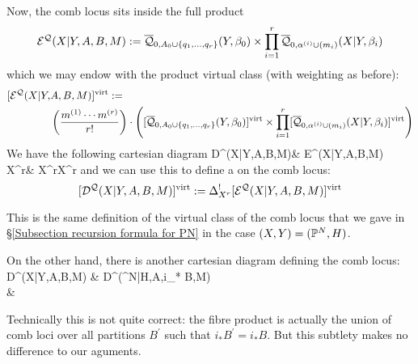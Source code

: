 Now, the comb locus sits inside the full product
\begin{equation*} \mathcal E^{\mathcal{Q}}(X|Y,A,B,M) := \overline{\mathcal Q}_{0,A_0 \cup \{q_1, \ldots, q_r\}}(Y,\beta_0) \times \prod_{i=1}^r \overline{\mathcal Q}_{0,\alpha^{(i)}\cup (m_i)}(X|Y,\beta_i) \end{equation*}
which we may endow with the product virtual class (with weighting as before):
\begin{align*} [\mathcal E^{\mathcal{Q}}(X|Y, & A,B,M)]^{\operatorname{virt}} := \\
& \left( \dfrac{m^{(1)} \cdots m^{(r)}}{r!}\right) \cdot \left( [\overline{\mathcal Q}_{0,A_0 \cup \{q_1, \ldots, q_r\}}(Y,\beta_0)]^{\operatorname{virt}} \times \prod_{i=1}^r [\overline{\mathcal Q}_{0,\alpha^{(i)}\cup (m_i)}(X|Y,\beta_i)]^{\operatorname{virt}} \right) \end{align*}
We have the following cartesian diagram
\bcd
\mathcal D^{}(X|Y,A,B,M)\ar[r]\ar[d] & \mathcal E^{}(X|Y,A,B,M)\ar[d] \\
X^r\ar[r,"\Delta_{X^r}"] & X^r\times X^r
\ecd
and we can use this to define a  on the comb locus:
\[
 [\mathcal D^{\mathcal{Q}}(X|Y,A,B,M)]^{\operatorname{virt}} := \Delta_{X^r}^![\mathcal E^{\mathcal{Q}}(X|Y,A,B,M)]^{\operatorname{virt}}
\]
\begin{remark} This is the same definition of the virtual class of the comb locus that we gave in \S \ref{Subsection recursion formula for PN} in the case $(X,Y)=(\mathbb P^N,H)$. \end{remark}

On the other hand, there is another cartesian diagram defining the comb locus:
\bcd
\mathcal D^(X|Y,A,B,M) \ar[r,"k"] \ar[d]  & \mathcal D^(\PP^N|H,A,i_* B,M) \ar[d] \\
 \ar[r,"k"] & 
\ecd
\begin{remark} Technically this is not quite correct: the fibre product is actually the union of comb loci over all partitions $B^\prime$ such that $i_* B^\prime = i_*B$. But this subtlety makes no difference to our aguments. \end{remark}

